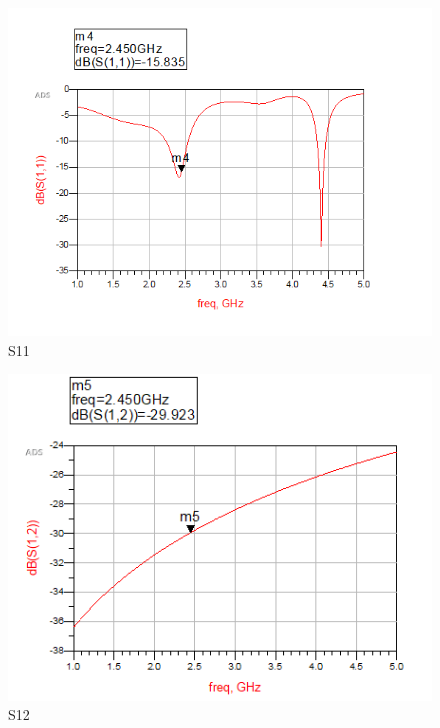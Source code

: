 \documentclass[12pt,a4paper]{report}
\begin{document}
\begin{figure}
    \centerline{\includegraphics{S11.PNG}}
    \caption{S11}
    \label{fig:S11}
\end{figure}

\begin{figure}
    \centerline{\includegraphics{S12.PNG}}
    \caption{S12}
\end{figure}
\end{document}
